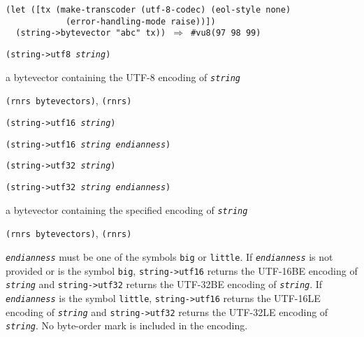 \begin{alltt}
(let ([tx (make-transcoder (utf-8-codec) (eol-style none)
            (error-handling-mode raise))])
  (string-\textgreater{}bytevector "abc" tx)) \(\Rightarrow\) \#{}vu8(97 98 99)
\end{alltt}

\begin{description}

\label{io_s93}\item[procedure] \texttt{(string-\textgreater{}utf8 \textit{string})}



\item[returns] a bytevector containing the UTF-8 encoding of \texttt{\textit{string}}


\item[libraries] \texttt{(rnrs bytevectors)}, \texttt{(rnrs)}
\end{description}

\begin{description}

\label{io_s94}\item[procedure] \texttt{(string-\textgreater{}utf16 \textit{string})}



\item[procedure] \texttt{(string-\textgreater{}utf16 \textit{string} \textit{endianness})}



\item[procedure] \texttt{(string-\textgreater{}utf32 \textit{string})}



\item[procedure] \texttt{(string-\textgreater{}utf32 \textit{string} \textit{endianness})}



\item[returns] a bytevector containing the specified encoding of \texttt{\textit{string}}


\item[libraries] \texttt{(rnrs bytevectors)}, \texttt{(rnrs)}
\end{description}

\texttt{\textit{endianness}} must be one of the symbols \texttt{big} or \texttt{little}.
If \texttt{\textit{endianness}} is not provided or is the symbol \texttt{big},
\texttt{string-\textgreater{}utf16} returns the UTF-16BE encoding of \texttt{\textit{string}} and
\texttt{string-\textgreater{}utf32} returns the UTF-32BE encoding of \texttt{\textit{string}}.
If \texttt{\textit{endianness}} is the symbol \texttt{little}, \texttt{string-\textgreater{}utf16} returns the
UTF-16LE encoding of \texttt{\textit{string}} and \texttt{string-\textgreater{}utf32} returns the
UTF-32LE encoding of \texttt{\textit{string}}.
No byte-order mark is included in the encoding.


